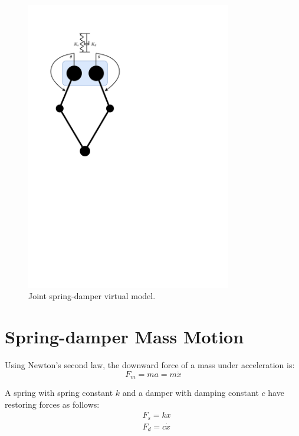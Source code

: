 \begin{figure}
\centering
\includegraphics[clip, trim=2cm 12cm 10cm 2cm, page = 1, width=0.8\textwidth]{images/geometry/joint-spring-damper} 
\caption{Joint spring-damper virtual model.}
\label{fig:Joint spring-damper virtual model}
\end{figure}

\section{Spring-damper Mass Motion}
Using Newton's second law, the downward force of a mass under acceleration is:
\begin{equation}
F_m = ma = m\ddot{x}
\end{equation}

A spring with spring constant $k$ and a damper with damping constant $c$ have restoring forces as follows:
\begin{equation}
\begin{aligned}
&F_s = kx \\
&F_d = c\dot{x}
\end{aligned}
\end{equation}

